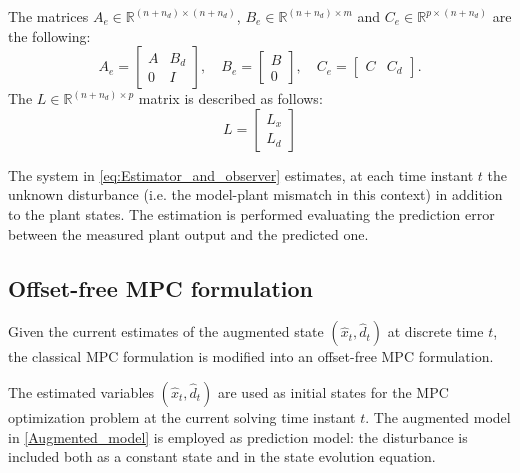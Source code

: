 \documentclass[a4paper,12pt,oneside]{book}
\begin{document}
The matrices $A_e \in \mathbb{R}^{(n+n_d) \times (n+n_d)}$, $B_e \in \mathbb{R}^{(n+n_d) \times m}$ and $C_e \in \mathbb{R}^{p \times (n + n_d)}$ are the following:
\begin{equation}
    A_e =
    \begin{bmatrix}
        A & B_d \\
        0 & I  
    \end{bmatrix},
    \quad
    B_e = 
    \begin{bmatrix}
        B \\
        0  
    \end{bmatrix},
    \quad
    C_e = 
    \begin{bmatrix}
        C & C_d 
    \end{bmatrix}.
\end{equation}
The $L \in \mathbb{R}^{(n+n_d) \times p}$ matrix is described as follows:
\begin{equation}
    L =
    \begin{bmatrix}
        L_x \\
	L_d 
    \end{bmatrix}
\end{equation}

The system in \eqref{eq:Estimator_and_observer} estimates, at each time instant $t$ the unknown disturbance (i.e. the model-plant mismatch in this context) in addition to the plant states. 
The estimation is performed evaluating the prediction error between the measured plant output and the predicted one.

\subsection*{Offset-free MPC formulation}
Given the current estimates of the augmented state $(\hat{x}_t, \hat{d}_t)$ at discrete time $t$, the classical MPC formulation is modified into an offset-free MPC formulation.

The estimated variables  $(\hat{x}_t, \hat{d}_t)$ are used as initial states for the MPC optimization problem at the current solving time instant $t$.
The augmented model in \eqref{Augmented_model} is employed as prediction model: the disturbance is included both as a constant state and in the state evolution equation.
\end{document}
